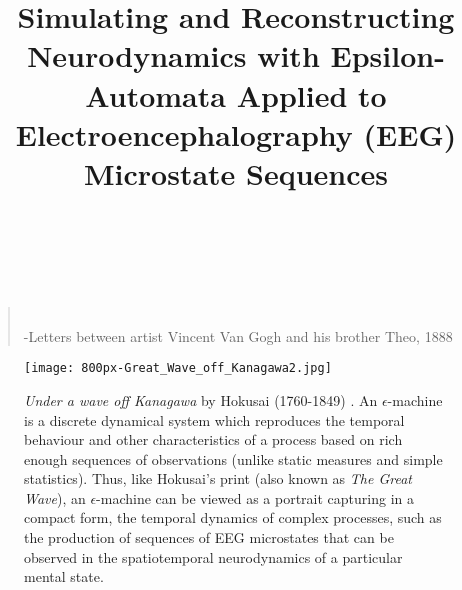 \documentclass[journal]{IEEEtran}
\begin{document}
\title{Simulating and Reconstructing Neurodynamics with Epsilon-Automata Applied to Electroencephalography (EEG) Microstate Sequences}

\author{\\[2ex]
\\[1ex]
}

\maketitle

\begin{center}
\begin{quote}
\hspace{1.1in}{\it  ``.... these waves are claws,
the boat is caught in them,
you can feel it.''}\\
\hspace{1.13in} -Letters between artist Vincent Van Gogh and his brother Theo, 1888
\end{quote}


\begin{figure}[!ht]
\centering
\texttt{[image: 800px-Great\_Wave\_off\_Kanagawa2.jpg]}
\caption{{\it Under a wave off Kanagawa} by Hokusai (1760-1849) \cite{Hokusai}. An $\epsilon$-machine 
is a discrete dynamical system which reproduces the temporal behaviour and other characteristics of a process based on rich enough sequences of observations (unlike static
measures and simple statistics).
Thus, like Hokusai's print (also known as {\it The Great Wave}),  an $\epsilon$-machine can be viewed as a portrait capturing in a compact form, the temporal dynamics of
 complex processes, such as the production of sequences of EEG microstates that can be observed in the spatiotemporal neurodynamics of
a particular mental state.}
\label{stillness}
\end{figure}
\end{center}
\end{document}
